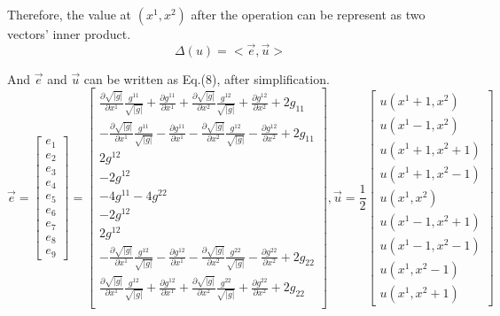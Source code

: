 \documentclass{article}
\theoremstyle{definition}
\theoremstyle{plain}
\begin{document}
Therefore, the value at $(x^1,x^2)$ after the operation can be represent as two vectors' inner product.
\begin{equation}
    \Delta(u) =<\vec{e},\vec{u}>
\end{equation}

And $\vec{e}$ and $\vec{u}$ can be written as Eq.(8), after simplification.
\begin{equation}
    \vec e=\left[
    \begin{array}{cc}
         e_1\\
         e_2\\
         e_3\\
         e_4\\
         e_5\\
         e_6\\
         e_7\\
         e_8\\
         e_9
    \end{array}
    \right]=\left[
    \begin{array}{cc}
         \frac{\partial \sqrt{|g|}}{\partial x^1}\frac{g^{11}}{\sqrt{|g|}}+\frac{\partial g^{11}}{\partial x^1}+\frac{\partial \sqrt{|g|}}{\partial x^2}\frac{g^{12}}{\sqrt{|g|}}+\frac{\partial g^{12}}{\partial x^2}+2g_{11}\\
         -\frac{\partial \sqrt{|g|}}{\partial x^1}\frac{g^{11}}{\sqrt{|g|}}-\frac{\partial g^{11}}{\partial x^1}-\frac{\partial \sqrt{|g|}}{\partial x^2}\frac{g^{12}}{\sqrt{|g|}}-\frac{\partial g^{12}}{\partial x^2}+2g_{11}\\
         2g^{12}\\
         -2g^{12}\\
         -4g^{11}-4g^{22}\\
         -2g^{12}\\
         2g^{12}\\
         -\frac{\partial \sqrt{|g|}}{\partial x^1}\frac{g^{12}}{\sqrt{|g|}}-\frac{\partial g^{12}}{\partial x^1}-\frac{\partial \sqrt{|g|}}{\partial x^2}\frac{g^{22}}{\sqrt{|g|}}-\frac{\partial g^{22}}{\partial x^2}+2g_{22}\\
         \frac{\partial \sqrt{|g|}}{\partial x^1}\frac{g^{12}}{\sqrt{|g|}}+\frac{\partial g^{12}}{\partial x^1}+\frac{\partial \sqrt{|g|}}{\partial x^2}\frac{g^{22}}{\sqrt{|g|}}+\frac{\partial g^{22}}{\partial x^2}+2g_{22}\\
    \end{array}
    \right],
    \vec u=\frac{1}{2}\left[
    \begin{array}{cc}
         u(x^1+1,x^2)  \\
         u(x^1-1,x^2)   \\
         u(x^1+1,x^2+1)  \\
         u(x^1+1,x^2-1)   \\
         u(x^1,x^2)   \\
         u(x^1-1,x^2+1)   \\
         u(x^1-1,x^2-1)   \\
         u(x^1,x^2-1) \\
         u(x^1,x^2+1)  
    \end{array}
    \right]
\end{equation}
\end{document}
